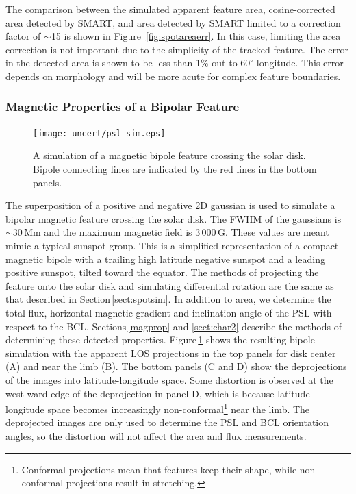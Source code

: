 The comparison between the simulated apparent feature area, cosine-corrected area detected by SMART, and area detected by SMART limited to a correction factor of $\sim$15 is shown in Figure~\ref{fig:spotareaerr}. In this case, limiting the area correction is not important due to the simplicity of the tracked feature. The error in the detected area is shown to be less than 1\% out to $60^{\circ}$ longitude. This error depends on morphology and will be more acute for complex feature boundaries.

\subsubsection{Magnetic Properties of a Bipolar Feature}\label{sect:bipolesim}

\begin{figure}[!t]
\centerline{\texttt{[image: uncert/psl\_sim.eps]}}
\caption[A bipole feature disk-crossing simulation.]{A simulation of a magnetic bipole feature crossing the solar disk. Bipole connecting lines are indicated by the red lines in the bottom panels.}\label{fig:bipolesim}
\end{figure}

The superposition of a positive and negative 2D gaussian is used to simulate a bipolar magnetic feature crossing the solar disk. The \gls{FWHM} of the gaussians is $\sim$30\,Mm and the maximum magnetic field is 3\,000\,G. These values are meant mimic a typical sunspot group. This is a simplified representation of a compact magnetic bipole with a trailing high latitude negative sunspot and a leading positive sunspot, tilted toward the equator. The methods of projecting the feature onto the solar disk and simulating differential rotation are the same as that described in Section\,\ref{sect:spotsim}. In addition to area, we determine the total flux, horizontal magnetic gradient and inclination angle of the \gls{PSL} with respect to the \gls{BCL}. Sections\,\ref{magprop} and \ref{sect:char2} describe the methods of determining these detected properties. Figure\,\ref{fig:bipolesim} shows the resulting bipole simulation with the apparent \gls{LOS} projections in the top panels for disk center (A) and near the limb (B). The bottom panels (C and D) show the deprojections of the images into latitude-longitude space. Some distortion is observed at the west-ward edge of the deprojection in panel D, which is because latitude-longitude space becomes increasingly non-conformal\footnote{Conformal projections mean that features keep their shape, while non-conformal projections result in stretching.} near the limb. The deprojected images are only used to determine the PSL and BCL orientation angles, so the distortion will not affect the area and flux measurements.

